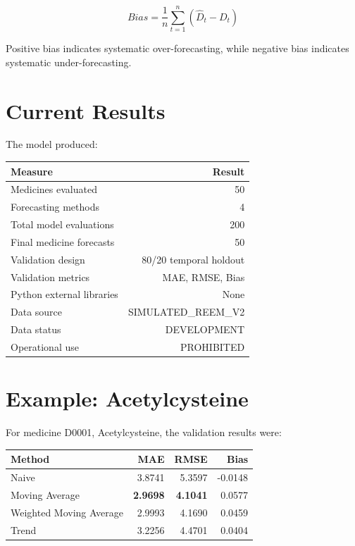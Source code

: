 \documentclass[11pt,a4paper]{article}
\begin{document}
\[
Bias=
\frac{1}{n}
\sum_{t=1}^{n}
(\hat{D}_t-D_t)
\]

Positive bias indicates systematic over-forecasting, while negative bias
indicates systematic under-forecasting.

\section{Current Results}

The model produced:

\begin{center}
\begin{tabular}{lr}
\toprule
Measure & Result\\
\midrule
Medicines evaluated & 50\\
Forecasting methods & 4\\
Total model evaluations & 200\\
Final medicine forecasts & 50\\
Validation design & 80/20 temporal holdout\\
Validation metrics & MAE, RMSE, Bias\\
Python external libraries & None\\
Data source & SIMULATED\_REEM\_V2\\
Data status & DEVELOPMENT\\
Operational use & PROHIBITED\\
\bottomrule
\end{tabular}
\end{center}

\section{Example: Acetylcysteine}

For medicine D0001, Acetylcysteine, the validation results were:

\begin{center}
\begin{tabular}{lrrr}
\toprule
Method & MAE & RMSE & Bias\\
\midrule
Naive & 3.8741 & 5.3597 & -0.0148\\
Moving Average & \textbf{2.9698} & \textbf{4.1041} & 0.0577\\
Weighted Moving Average & 2.9993 & 4.1690 & 0.0459\\
Trend & 3.2256 & 4.4701 & 0.0404\\
\bottomrule
\end{tabular}
\end{center}
\end{document}
